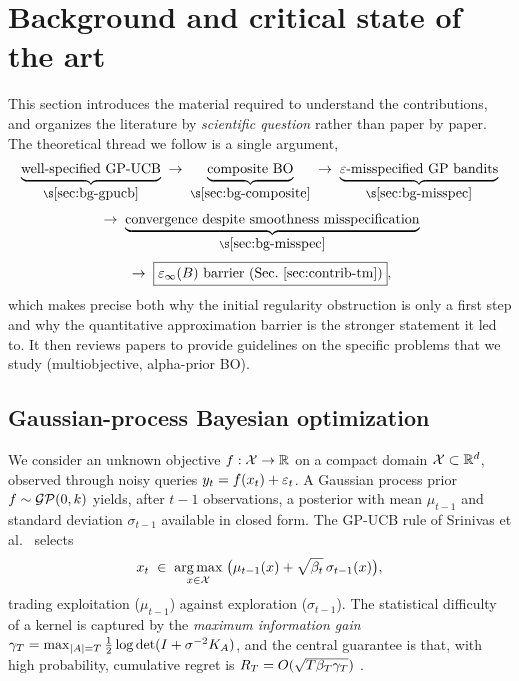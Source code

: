 \section{Background and critical state of the art}
\label{sec:background}

This section introduces the material required
to understand the contributions, and organizes the literature by
\emph{scientific question} rather than paper by paper. The theoretical thread we
follow is a single argument,
\[
\begin{gathered}
\underbrace{\text{well-specified GP-UCB}}_{\S\ref{sec:bg-gpucb}}
\;\rightarrow\;
\underbrace{\text{composite BO}}_{\S\ref{sec:bg-composite}}
\;\rightarrow\;
\underbrace{\eps\text{-misspecified GP bandits}}_{\S\ref{sec:bg-misspec}}
\\[0.1cm]
\;\rightarrow\;
\underbrace{\text{convergence despite smoothness misspecification}}_{\S\ref{sec:bg-misspec}}
\\[0.1cm]
\;\rightarrow\;
\boxed{\epsinf(B)\text{ barrier (Sec.~\ref{sec:contrib-tm})}},
\end{gathered}
\]
\vspace{0.1cm}
which makes precise both why the initial regularity obstruction is only a first
step and why the quantitative approximation barrier is the stronger statement it
led to. It then reviews papers to provide guidelines on the specific problems that we study (multiobjective, alpha-prior BO).

\subsection{Gaussian-process Bayesian optimization}
\label{sec:bg-gpucb}

We consider an unknown objective $f:\mathcal{X}\to\mathbb{R}$ on a compact domain
$\mathcal{X}\subset\mathbb{R}^d$, observed through noisy queries $y_t=f(x_t)+\varepsilon_t$. A Gaussian
process prior $f\sim\mathcal{GP}(0,k)$ yields, after $t-1$ observations, a posterior with
mean $\mu_{t-1}$ and standard deviation $\sigma_{t-1}$ available in closed form.
The GP-UCB rule of Srinivas et al.~\cite{srinivas2010} selects
\begin{equation}
  x_t \;\in\; \operatorname*{arg\,max}_{x\in\mathcal{X}}\;\bigl(\mu_{t-1}(x)+\sqrt{\beta_t}\,\sigma_{t-1}(x)\bigr),
  \label{eq:bg-gpucb}
\end{equation}
trading exploitation ($\mu_{t-1}$) against exploration ($\sigma_{t-1}$). The
statistical difficulty of a kernel is captured by the \emph{maximum information
gain} $\gamma_T=\max_{|A|=T}\tfrac12\log\det(I+\sigma^{-2}K_A)$, and the central
guarantee is that, with high probability, cumulative regret is
$R_T=O(\sqrt{T\beta_T\gamma_T})$
\cite{srinivas2010}. \hfill\Plit

